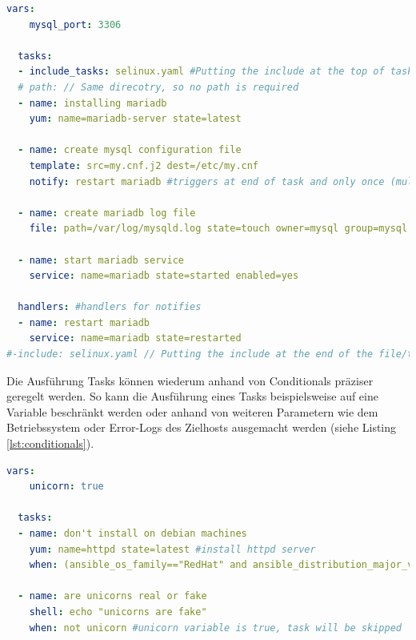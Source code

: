 \documentclass[biblatex]{lni}
\begin{document}
\begin{lstlisting}[language=yaml, caption={Beschreibung eines Playbooks mit dem Namen \textit{mariadb test}}, label=lst:mariadbtasks,firstnumber=7]
  vars:
    mysql_port: 3306

  tasks:
  - include_tasks: selinux.yaml #Putting the include at the top of tasks means it will be executed first
  # path: // Same direcotry, so no path is required
  - name: installing mariadb
    yum: name=mariadb-server state=latest

  - name: create mysql configuration file
    template: src=my.cnf.j2 dest=/etc/my.cnf
    notify: restart mariadb #triggers at end of task and only once (multiple notifies possible)

  - name: create mariadb log file
    file: path=/var/log/mysqld.log state=touch owner=mysql group=mysql mode=0775

  - name: start mariadb service
    service: name=mariadb state=started enabled=yes

  handlers: #handlers for notifies
  - name: restart mariadb
    service: name=mariadb state=restarted
#-include: selinux.yaml // Putting the include at the end of the file/top hierarchy executes the target as a standard playbook. That means e.g. conditionals or failtesting of this playbook won't apply on the included one.
\end{lstlisting}

Die Ausführung Tasks können wiederum anhand von Conditionals präziser geregelt werden. So kann die Ausführung eines Tasks beispielsweise auf eine Variable beschränkt werden oder anhand von weiteren Parametern wie dem Betriebssystem oder Error-Logs des Zielhosts ausgemacht werden (siehe Listing \ref{lst:conditionals}).
\begin{lstlisting}[language=yaml, caption={Das MariaDB Beispiel wird umgeben von einem Block, um ein Conditional auf alle Tasks zu beziehen}, label=lst:conditionals]
  vars:
    unicorn: true

  tasks:
  - name: don't install on debian machines
    yum: name=httpd state=latest #install httpd server
    when: (ansible_os_family=="RedHat" and ansible_distribution_major_version=="6") #condition on operating system

  - name: are unicorns real or fake
    shell: echo "unicorns are fake"
    when: not unicorn #unicorn variable is true, task will be skipped
\end{lstlisting}
\end{document}

